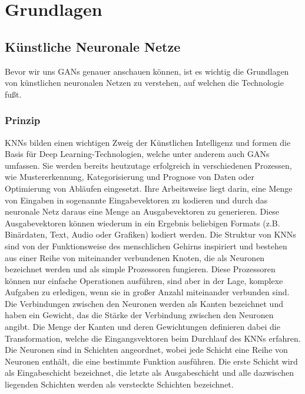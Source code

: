 \chapter{Grundlagen}

\section{Künstliche Neuronale Netze}

\noindent Bevor wir uns \acp{GAN} genauer anschauen können, ist es wichtig die Grundlagen von künstlichen neuronalen Netzen zu verstehen, auf welchen die Technologie fußt.

\subsection{Prinzip}

\noindent \acp{KNN} bilden einen wichtigen Zweig der Künstlichen Intelligenz und formen die Basis für Deep Learning-Technologien, welche unter anderem auch GANs umfassen. Sie werden bereits heutzutage erfolgreich in verschiedenen Prozessen, wie Mustererkennung, Kategorisierung und Prognose von Daten oder Optimierung von Abläufen eingesetzt. Ihre Arbeitsweise liegt darin, eine Menge von Eingaben in sogenannte Eingabevektoren zu kodieren und durch das neuronale Netz daraus eine Menge an Ausgabevektoren zu generieren. Diese Ausgabevektoren können wiederum in ein Ergebnis beliebigen Formats (z.B. Binärdaten, Text, Audio oder Grafiken) kodiert werden. Die Struktur von \acp{KNN} sind von der Funktionsweise des menschlichen Gehirns inspiriert und bestehen aus einer Reihe von miteinander verbundenen Knoten, die als Neuronen bezeichnet werden und als simple Prozessoren fungieren. Diese Prozessoren können nur einfache Operationen ausführen, sind aber in der Lage, komplexe Aufgaben zu erledigen, wenn sie in großer Anzahl miteinander verbunden sind. Die Verbindungen zwischen den Neuronen werden als Kanten bezeichnet und haben ein Gewicht, das die Stärke der Verbindung zwischen den Neuronen angibt. Die Menge der Kanten und deren Gewichtungen definieren dabei die Transformation, welche die Eingangsvektoren beim Durchlauf des \ac{KNN}s erfahren. Die Neuronen sind in Schichten angeordnet, wobei jede Schicht eine Reihe von Neuronen enthält, die eine bestimmte Funktion ausführen. Die erste Schicht wird als Eingabeschicht bezeichnet, die letzte als Ausgabeschicht und alle dazwischen liegenden Schichten werden als versteckte Schichten bezeichnet.\cite{knnbook}\\

